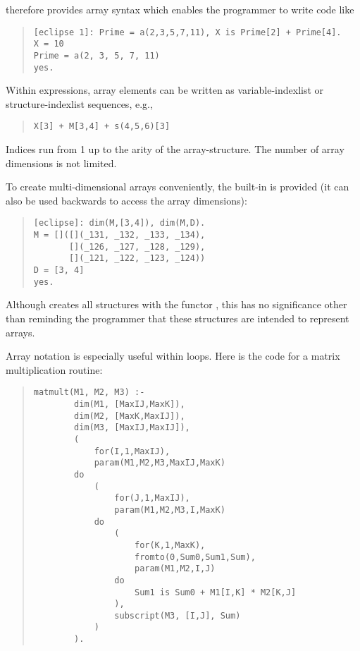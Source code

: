 {\eclipse} therefore provides array syntax which enables the
programmer to write code like
\begin{quote}
\begin{verbatim}
[eclipse 1]: Prime = a(2,3,5,7,11), X is Prime[2] + Prime[4].
X = 10
Prime = a(2, 3, 5, 7, 11)
yes.
\end{verbatim}
\end{quote}
Within expressions, array elements can be written as variable-indexlist
or structure-indexlist sequences, e.g.,
\begin{quote}
\begin{verbatim}
X[3] + M[3,4] + s(4,5,6)[3]
\end{verbatim}
\end{quote}
Indices run from 1 up to the arity of the array-structure.
The number of array dimensions is not limited.

To create multi-dimensional arrays conveniently, the built-in
is provided (it can also be used backwards to access
the array dimensions):
\begin{quote}
\begin{verbatim}
[eclipse]: dim(M,[3,4]), dim(M,D).
M = []([](_131, _132, _133, _134),
       [](_126, _127, _128, _129),
       [](_121, _122, _123, _124))
D = [3, 4]
yes.
\end{verbatim}
\end{quote}
Although
creates all structures with the functor \nil , this has
no significance other than reminding the programmer that
these structures are intended to represent arrays.

Array notation is especially useful within loops.
Here is the code for a matrix multiplication routine:
\begin{quote}
\begin{verbatim}
matmult(M1, M2, M3) :-
        dim(M1, [MaxIJ,MaxK]),
        dim(M2, [MaxK,MaxIJ]),
        dim(M3, [MaxIJ,MaxIJ]),
        (
            for(I,1,MaxIJ),
            param(M1,M2,M3,MaxIJ,MaxK)
        do
            (
                for(J,1,MaxIJ),
                param(M1,M2,M3,I,MaxK)
            do
                (
                    for(K,1,MaxK),
                    fromto(0,Sum0,Sum1,Sum),
                    param(M1,M2,I,J)
                do
                    Sum1 is Sum0 + M1[I,K] * M2[K,J]
                ),
                subscript(M3, [I,J], Sum)
            )
        ).
\end{verbatim}
\end{quote}



